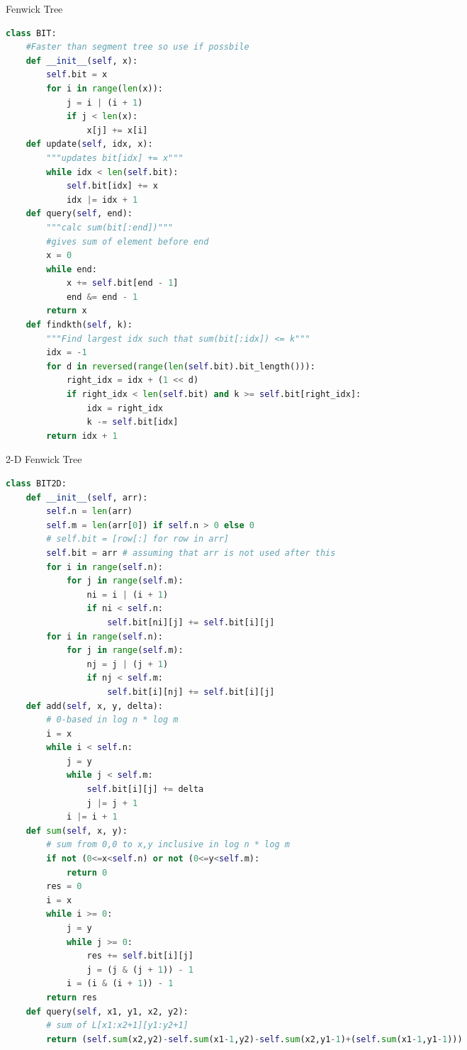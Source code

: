 \documentclass[10pt,landscape, a4paper]{article}
\begin{document}
\begin{multicols*}{3}
Fenwick Tree
\begin{lstlisting}[language=Python]
class BIT:
    #Faster than segment tree so use if possbile
    def __init__(self, x):
        self.bit = x
        for i in range(len(x)):
            j = i | (i + 1)
            if j < len(x):
                x[j] += x[i]
    def update(self, idx, x):
        """updates bit[idx] += x"""
        while idx < len(self.bit):
            self.bit[idx] += x
            idx |= idx + 1
    def query(self, end):
        """calc sum(bit[:end])"""
        #gives sum of element before end
        x = 0
        while end:
            x += self.bit[end - 1]
            end &= end - 1
        return x
    def findkth(self, k):
        """Find largest idx such that sum(bit[:idx]) <= k"""
        idx = -1
        for d in reversed(range(len(self.bit).bit_length())):
            right_idx = idx + (1 << d)
            if right_idx < len(self.bit) and k >= self.bit[right_idx]:
                idx = right_idx
                k -= self.bit[idx]
        return idx + 1
\end{lstlisting}

2-D Fenwick Tree
\begin{lstlisting}[language=Python]
class BIT2D:
    def __init__(self, arr):
        self.n = len(arr)
        self.m = len(arr[0]) if self.n > 0 else 0
        # self.bit = [row[:] for row in arr]
        self.bit = arr # assuming that arr is not used after this
        for i in range(self.n):
            for j in range(self.m):
                ni = i | (i + 1)
                if ni < self.n:
                    self.bit[ni][j] += self.bit[i][j]
        for i in range(self.n):
            for j in range(self.m):
                nj = j | (j + 1)
                if nj < self.m:
                    self.bit[i][nj] += self.bit[i][j]
    def add(self, x, y, delta):
        # 0-based in log n * log m
        i = x
        while i < self.n:
            j = y
            while j < self.m:
                self.bit[i][j] += delta
                j |= j + 1
            i |= i + 1
    def sum(self, x, y):
        # sum from 0,0 to x,y inclusive in log n * log m
        if not (0<=x<self.n) or not (0<=y<self.m):
            return 0
        res = 0
        i = x
        while i >= 0:
            j = y
            while j >= 0:
                res += self.bit[i][j]
                j = (j & (j + 1)) - 1
            i = (i & (i + 1)) - 1
        return res
    def query(self, x1, y1, x2, y2):
        # sum of L[x1:x2+1][y1:y2+1]
        return (self.sum(x2,y2)-self.sum(x1-1,y2)-self.sum(x2,y1-1)+(self.sum(x1-1,y1-1)))
\end{lstlisting}


\end{multicols*}
\end{document}
